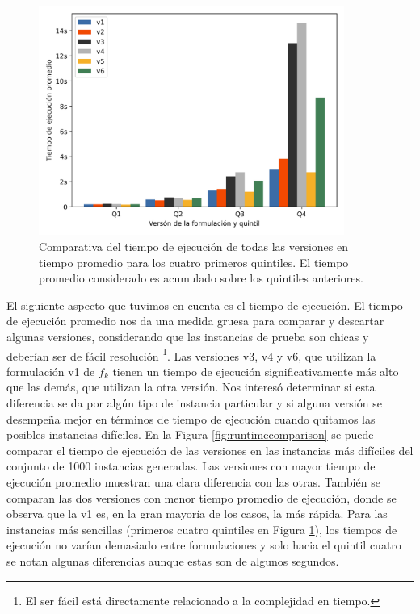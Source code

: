 \documentclass{article}
\begin{document}
  \begin{figure}[h!]
    \centering
    \includegraphics[width=10cm]{../resources/run_time_comparsion_by_quintile.png}
      \caption{Comparativa del tiempo de ejecución de todas las versiones en tiempo promedio para los cuatro primeros quintiles. El tiempo promedio considerado es acumulado sobre los quintiles anteriores.}
    \label{fig:firstfourquintiles}
  \end{figure}

  El siguiente aspecto que tuvimos en cuenta es el tiempo de ejecución. El tiempo de ejecución promedio nos da una medida gruesa para comparar y descartar algunas versiones, considerando que las instancias de prueba son chicas y deberían ser de fácil resolución \footnote{El ser fácil está directamente relacionado a la complejidad en tiempo.}. Las versiones v3, v4 y v6, que utilizan la formulación v1 de $f_k$ tienen un tiempo de ejecución significativamente más alto que las demás, que utilizan la otra versión. Nos interesó determinar si esta diferencia se da por algún tipo de instancia particular y si alguna versión se desempeña mejor en términos de tiempo de ejecución cuando quitamos las posibles instancias difíciles. En la Figura \ref{fig:runtimecomparison} se puede comparar el tiempo de ejecución de las versiones en las instancias más difíciles del conjunto de 1000 instancias generadas. Las versiones con mayor tiempo de ejecución promedio muestran una clara diferencia con las otras. También se comparan las dos versiones con menor tiempo promedio de ejecución, donde se observa que la v1 es, en la gran mayoría de los casos, la más rápida. Para las instancias más sencillas (primeros cuatro quintiles en Figura \ref{fig:firstfourquintiles}), los tiempos de ejecución no varían demasiado entre formulaciones y solo hacia el quintil cuatro se notan algunas diferencias aunque estas son de algunos segundos.
\end{document}
